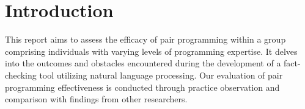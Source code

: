 \section{Introduction}
This report aims to assess the efficacy of pair programming within a group comprising individuals with varying levels of programming expertise. It delves into the outcomes and obstacles encountered during the development of a fact-checking tool utilizing natural language processing. Our evaluation of pair programming effectiveness is conducted through practice observation and comparison with findings from other researchers.